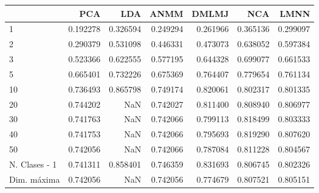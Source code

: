 \begin{tabular}{lrrrrrr}
\toprule
{} &       PCA &       LDA &      ANMM &     DMLMJ &       NCA &      LMNN \\
\midrule
1             &  0.192278 &  0.326594 &  0.249294 &  0.261966 &  0.365136 &  0.299097 \\
2             &  0.290379 &  0.531098 &  0.446331 &  0.473073 &  0.638052 &  0.597384 \\
3             &  0.523366 &  0.622555 &  0.577195 &  0.644328 &  0.699077 &  0.661533 \\
5             &  0.665401 &  0.732226 &  0.675369 &  0.764407 &  0.779654 &  0.761134 \\
10            &  0.736493 &  0.865798 &  0.749174 &  0.820061 &  0.802317 &  0.801335 \\
20            &  0.744202 &       NaN &  0.742027 &  0.811400 &  0.808940 &  0.806977 \\
30            &  0.741763 &       NaN &  0.742066 &  0.799113 &  0.818499 &  0.803333 \\
40            &  0.741753 &       NaN &  0.742066 &  0.795693 &  0.819290 &  0.807620 \\
50            &  0.742056 &       NaN &  0.742066 &  0.787084 &  0.811228 &  0.804567 \\
N. Clases - 1 &  0.741311 &  0.858401 &  0.746359 &  0.831693 &  0.806745 &  0.802326 \\
Dim. máxima   &  0.742056 &       NaN &  0.742056 &  0.774679 &  0.807521 &  0.805151 \\
\bottomrule
\end{tabular}
